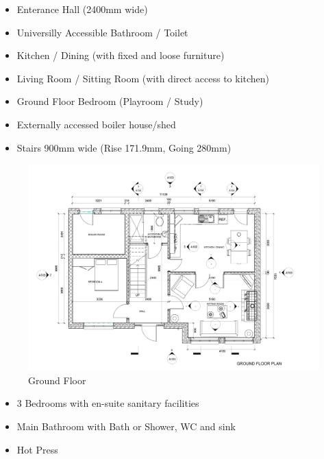 \begin{itemize}
	\item Enterance Hall (2400mm wide)
	\item Universilly Accessible Bathroom / Toilet
	\item Kitchen / Dining (with fixed and loose furniture)
	\item Living Room / Sitting Room (with direct access to kitchen)
	\item Ground Floor Bedroom (Playroom / Study)
	\item Externally accessed boiler house/shed
	\item Stairs 900mm wide (Rise 171.9mm, Going 280mm)
\end{itemize}



\begin{figure}
	\centering
	\includegraphics[width=1.0\linewidth]{img/P01GroundFloorLevel.jpg}
	\caption{Ground Floor}
	\label{fig:p01groundfloorlevel}
\end{figure}


\newpage

\begin{itemize}
	\item 3 Bedrooms with en-suite sanitary facilities
	\item Main Bathroom with Bath or Shower, WC and sink
	\item Hot Press
\end{itemize}



